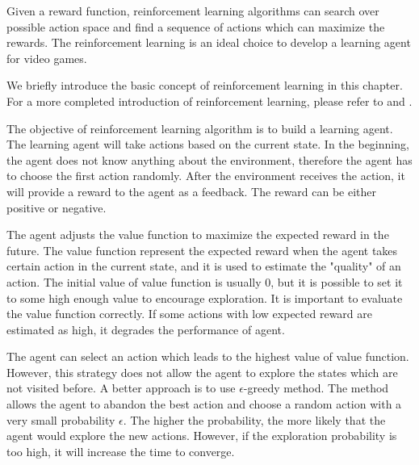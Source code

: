 


Given a reward function, reinforcement learning algorithms can
search over possible action space and find a sequence of actions 
which can maximize the rewards. The reinforcement learning is an ideal choice
to develop a learning agent for video games.

We briefly introduce the basic concept of reinforcement learning in this chapter. 
For a more completed introduction of reinforcement learning, please refer to
\cite{SuttonIntro} and \cite{KevinIntro}.

The objective of reinforcement learning algorithm is to build a learning agent. The learning agent will take
actions based on the current state. In the beginning, the agent does not know anything about 
the environment, therefore the agent has to choose the first action randomly. After the environment
receives the action, it will provide a reward to the agent as a feedback. The reward can be either
positive or negative.

The agent adjusts the value function to maximize the expected reward in the future.
The value function represent the expected reward when the agent takes certain action in the current
state, and it is used to estimate the "quality" of an action. The initial value of value function is 
usually 0, but it is possible to set it to some high enough value to encourage exploration.
It is important to evaluate the value function 
correctly. If some actions with low expected reward are estimated as high, it degrades the
performance of agent.

The agent can select an action which leads to the highest value of value function. However, 
this strategy does not allow the agent to explore the states which are not visited before.
A better approach is to use $\epsilon$-greedy method. The method allows the agent to abandon the
best action and choose
a random action with a very small probability $\epsilon$. The higher the probability, the more
likely that the agent would explore the new actions. However, if the exploration probability 
is too high, it will increase the time to converge.

